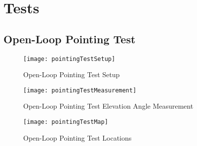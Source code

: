 \chapter{Tests}

\section{Open-Loop Pointing Test}
\begin{figure}[!htb]
  \begin{minipage}{.49\textwidth}
    \centering
    \texttt{[image: pointingTestSetup]}
    \caption{Open-Loop Pointing Test Setup}
    \label{fig:pointingTestSetup}
  \end{minipage}
  \begin{minipage}{.49\textwidth}
    \centering
    \texttt{[image: pointingTestMeasurement]}
    \caption{Open-Loop Pointing Test Elevation Angle Measurement}
    \label{fig:pointingTestMeasurement}
  \end{minipage}
\end{figure}

\begin{figure}[!htb]
  \centering
  \texttt{[image: pointingTestMap]}
  \caption{Open-Loop Pointing Test Locations}
  \label{fig:pointingTestMap}
\end{figure}

\clearpage
